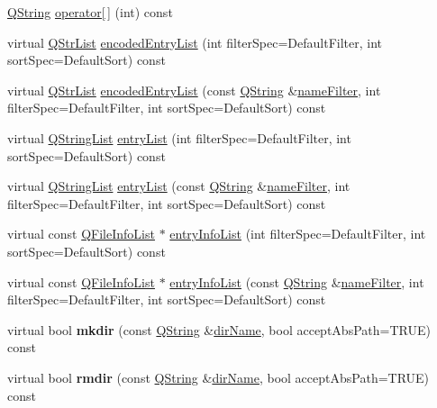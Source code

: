 \begin{DoxyCompactItemize}
\item 
\hyperlink{class_q_string}{Q\-String} \hyperlink{class_q_dir_ac47d67a1955be4e674d90f0621ba0937}{operator\mbox{[}$\,$\mbox{]}} (int) const 
\item 
virtual \hyperlink{class_q_str_list}{Q\-Str\-List} \hyperlink{class_q_dir_aaaeaab159aa6fee8d2cb8b6dfdf3836f}{encoded\-Entry\-List} (int filter\-Spec=Default\-Filter, int sort\-Spec=Default\-Sort) const 
\item 
virtual \hyperlink{class_q_str_list}{Q\-Str\-List} \hyperlink{class_q_dir_aec1c87e9f191b1bef76b75d2001f7287}{encoded\-Entry\-List} (const \hyperlink{class_q_string}{Q\-String} \&\hyperlink{class_q_dir_a52e506d0a7174c22b22f5f7c663b7e24}{name\-Filter}, int filter\-Spec=Default\-Filter, int sort\-Spec=Default\-Sort) const 
\item 
virtual \hyperlink{class_q_string_list}{Q\-String\-List} \hyperlink{class_q_dir_a31d8fe19dd240c844af9cf44e988384f}{entry\-List} (int filter\-Spec=Default\-Filter, int sort\-Spec=Default\-Sort) const 
\item 
virtual \hyperlink{class_q_string_list}{Q\-String\-List} \hyperlink{class_q_dir_a4c12091d0c7b067971e244fb1291d354}{entry\-List} (const \hyperlink{class_q_string}{Q\-String} \&\hyperlink{class_q_dir_a52e506d0a7174c22b22f5f7c663b7e24}{name\-Filter}, int filter\-Spec=Default\-Filter, int sort\-Spec=Default\-Sort) const 
\item 
virtual const \hyperlink{class_q_list}{Q\-File\-Info\-List} $\ast$ \hyperlink{class_q_dir_a455adcdcb8360dda877b634a8aca27fe}{entry\-Info\-List} (int filter\-Spec=Default\-Filter, int sort\-Spec=Default\-Sort) const 
\item 
virtual const \hyperlink{class_q_list}{Q\-File\-Info\-List} $\ast$ \hyperlink{class_q_dir_a49cccb861848a5eb8f068be21af6d7bb}{entry\-Info\-List} (const \hyperlink{class_q_string}{Q\-String} \&\hyperlink{class_q_dir_a52e506d0a7174c22b22f5f7c663b7e24}{name\-Filter}, int filter\-Spec=Default\-Filter, int sort\-Spec=Default\-Sort) const 
\item 
\hypertarget{class_q_dir_a14984b052293bc6219a8bb200b676bf0}{virtual bool {\bfseries mkdir} (const \hyperlink{class_q_string}{Q\-String} \&\hyperlink{class_q_dir_a66689b909d65b23eb7c218abf3803d84}{dir\-Name}, bool accept\-Abs\-Path=T\-R\-U\-E) const }\label{class_q_dir_a14984b052293bc6219a8bb200b676bf0}

\item 
\hypertarget{class_q_dir_ac7c9723df3ef1bcf6441d18c27e781d0}{virtual bool {\bfseries rmdir} (const \hyperlink{class_q_string}{Q\-String} \&\hyperlink{class_q_dir_a66689b909d65b23eb7c218abf3803d84}{dir\-Name}, bool accept\-Abs\-Path=T\-R\-U\-E) const }\label{class_q_dir_ac7c9723df3ef1bcf6441d18c27e781d0}


\end{DoxyCompactItemize}
